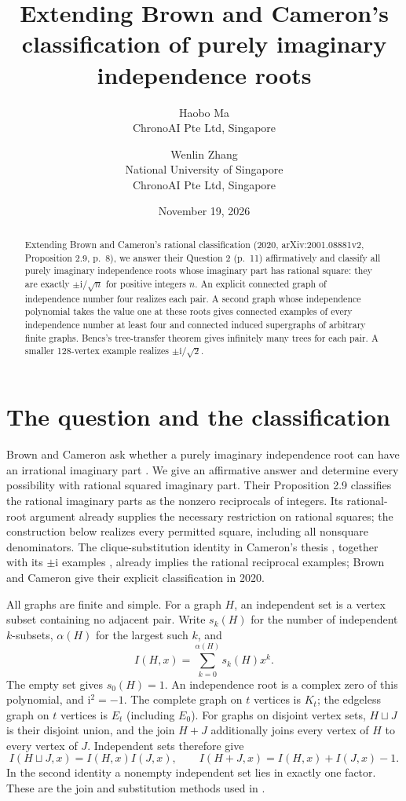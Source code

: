 \documentclass[11pt]{article}
\title{Extending Brown and Cameron's classification of purely imaginary independence roots}
\author{Haobo Ma\\\small ChronoAI Pte Ltd, Singapore
\and Wenlin Zhang\\\small National University of Singapore\\\small ChronoAI Pte Ltd, Singapore}
\date{November 19, 2026}
\newcommand{\ii}{\mathrm{i}}
\begin{document}
\maketitle
\begin{abstract}
Extending Brown and Cameron's rational classification (2020,
arXiv:2001.08881v2, Proposition 2.9, p.~8), we answer their Question 2
(p.~11) affirmatively and classify all purely imaginary independence roots
whose imaginary part has rational square: they are exactly
$\pm\ii/\sqrt{n}$ for positive integers $n$.
An explicit connected graph of independence number four realizes each pair.
A second graph whose independence polynomial takes the value one at these
roots gives connected examples of every independence number at least four
and connected induced supergraphs of arbitrary finite graphs.
Bencs's tree-transfer theorem gives infinitely many trees for each pair.
A smaller 128-vertex example realizes $\pm\ii/\sqrt{2}$.
\end{abstract}

\section{The question and the classification}
Brown and Cameron ask whether a purely imaginary independence root can
have an irrational imaginary part \cite[Question 2, p.~11]{BC}.
We give an affirmative answer and determine every possibility with rational
squared imaginary part. Their Proposition 2.9 classifies the rational
imaginary parts as the nonzero reciprocals of integers. Its rational-root
argument already supplies the necessary restriction on rational squares;
the construction below realizes every permitted square, including all
nonsquare denominators.
The clique-substitution identity in Cameron's thesis
\cite[Theorem 3.3.4, p.~40]{Cameron}, together with its
$\pm\ii$ examples \cite[Proposition 3.4.1, p.~43]{Cameron}, already
implies the rational reciprocal examples; Brown and Cameron give their
explicit classification in 2020.

All graphs are finite and simple. For a graph $H$, an independent set is
a vertex subset containing no adjacent pair. Write $s_k(H)$ for the number
of independent $k$-subsets, $\alpha(H)$ for the largest such $k$, and
\[
 I(H,x)=\sum_{k=0}^{\alpha(H)}s_k(H)x^k.
\]
The empty set gives $s_0(H)=1$. An independence root is a complex zero of
this polynomial, and $\ii^2=-1$. The complete graph on $t$ vertices is
$K_t$; the edgeless graph on $t$ vertices is $E_t$ (including $E_0$).
For graphs on disjoint vertex sets, $H\sqcup J$ is their disjoint union,
and the join $H+J$ additionally joins every vertex of $H$ to every vertex
of $J$. Independent sets therefore give
\begin{equation}\label{eq:operations}
 I(H\sqcup J,x)=I(H,x)I(J,x),\qquad
 I(H+J,x)=I(H,x)+I(J,x)-1.
\end{equation}
In the second identity a nonempty independent set lies in exactly one
factor. These are the join and substitution methods used in \cite{BC}.
\end{document}
